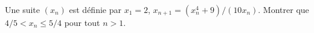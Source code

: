 Une suite $(x_n)$ est définie par $x_1 = 2$, $x_{n+1} = (x_n^4 + 9)/(10x_n)$. Montrer que $4/5 < x_n \leq 5/4$ pour tout $n > 1$.
